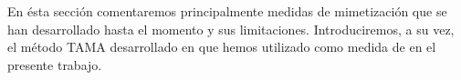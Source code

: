 En ésta sección comentaremos principalmente medidas de mimetización que se han desarrollado hasta el momento y sus limitaciones. Introduciremos, a su vez, el método TAMA desarrollado en \cite{KOU2008} que hemos utilizado como medida de \entrainment en el presente trabajo.





